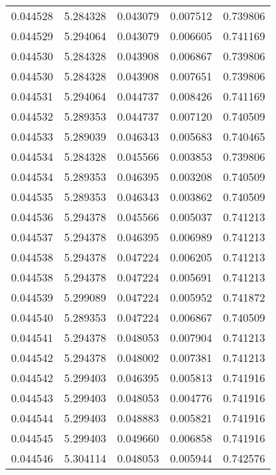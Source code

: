 \begin{tabular}{lrrrr}
0.044528    &  5.284328 &  0.043079 &  0.007512 &             0.739806 \\
0.044529    &  5.294064 &  0.043079 &  0.006605 &             0.741169 \\
0.044530    &  5.284328 &  0.043908 &  0.006867 &             0.739806 \\
0.044530    &  5.284328 &  0.043908 &  0.007651 &             0.739806 \\
0.044531    &  5.294064 &  0.044737 &  0.008426 &             0.741169 \\
0.044532    &  5.289353 &  0.044737 &  0.007120 &             0.740509 \\
0.044533    &  5.289039 &  0.046343 &  0.005683 &             0.740465 \\
0.044534    &  5.284328 &  0.045566 &  0.003853 &             0.739806 \\
0.044534    &  5.289353 &  0.046395 &  0.003208 &             0.740509 \\
0.044535    &  5.289353 &  0.046343 &  0.003862 &             0.740509 \\
0.044536    &  5.294378 &  0.045566 &  0.005037 &             0.741213 \\
0.044537    &  5.294378 &  0.046395 &  0.006989 &             0.741213 \\
0.044538    &  5.294378 &  0.047224 &  0.006205 &             0.741213 \\
0.044538    &  5.294378 &  0.047224 &  0.005691 &             0.741213 \\
0.044539    &  5.299089 &  0.047224 &  0.005952 &             0.741872 \\
0.044540    &  5.289353 &  0.047224 &  0.006867 &             0.740509 \\
0.044541    &  5.294378 &  0.048053 &  0.007904 &             0.741213 \\
0.044542    &  5.294378 &  0.048002 &  0.007381 &             0.741213 \\
0.044542    &  5.299403 &  0.046395 &  0.005813 &             0.741916 \\
0.044543    &  5.299403 &  0.048053 &  0.004776 &             0.741916 \\
0.044544    &  5.299403 &  0.048883 &  0.005821 &             0.741916 \\
0.044545    &  5.299403 &  0.049660 &  0.006858 &             0.741916 \\
0.044546    &  5.304114 &  0.048053 &  0.005944 &             0.742576 \\

\end{tabular}
